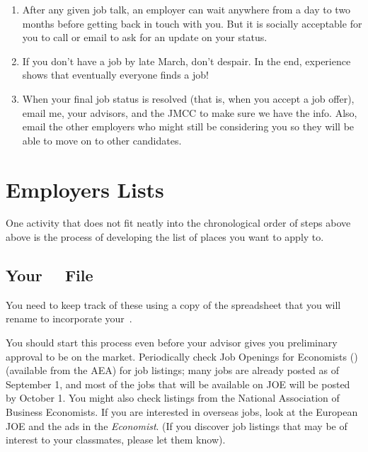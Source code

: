 \documentclass{\classes/econtex}
\begin{document}
\begin{enumerate}
  \hypertarget{How-Long-Will-It-Be}{}
\item After any given job talk, an employer can wait anywhere from a
  day to two months before getting back in touch with you.  But it is
  socially acceptable for you to call or email to ask for an update on
  your status.
  
  \hypertarget{Dont-Despair}{}
\item If you don't have a job by late March, don't despair.  In the
  end, experience shows that eventually everyone finds a job!

  \hypertarget{Report-Outcome}{}
\item When your final job status is resolved (that is, when you accept 
  a job offer), email me, your advisors, and the JMCC to make sure we have the info.
  Also, email the other employers who might still be considering you so they will be able to move on to other candidates.
  

\end{enumerate}

\section*{Employers Lists}\hypertarget{employers-lists}{}

One activity that does not fit neatly into the chronological order of steps above above is the process of developing the list of places you want to apply to.

\hypertarget{your-emw-file}{}
\subsection*{Your{~\EMW~} File}
You need to keep track of these using a copy of the {\Employers} spreadsheet that you will rename to incorporate your{~\Moniker}.

You should start this process even before your advisor gives you preliminary approval to be on the market.  Periodically check Job Openings for Economists (\JOE) (available from the AEA) for job listings; many jobs are already posted as of September 1, and most of the jobs that will be available on JOE will be posted by October 1.  You might also check listings from the National Association of Business Economists.  If you are interested in overseas jobs, look at the European JOE and the ads in the \textit{Economist}.  (If you discover job listings that may be of interest to your classmates, please let them know).
\end{document}
